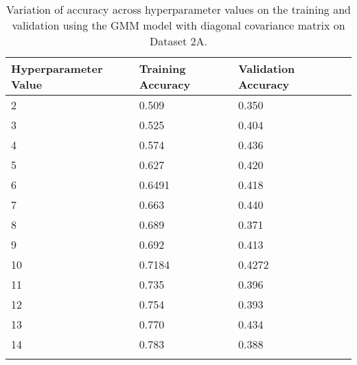 \begin{center}
\begin{longtable}{l l l l}
\hline
\hline
\textbf{Hyperparameter Value} & \textbf{Training Accuracy} & \textbf{Validation Accuracy}\\
\hline
\hline
2 & 0.509 & 0.350\\
3 & 0.525 & 0.404\\
4 & 0.574 & 0.436\\
5 & 0.627 & 0.420\\
6 & 0.6491 & 0.418\\
7 & 0.663 & 0.440\\
8 & 0.689 & 0.371\\
9 & 0.692 & 0.413\\
10 & 0.7184 & 0.4272\\
11 & 0.735 & 0.396\\
12 & 0.754 & 0.393\\
13 & 0.770 & 0.434\\
14 & 0.783 & 0.388\\
\hline
\caption{Variation of accuracy across hyperparameter values on the training and validation using the GMM model with diagonal covariance matrix on Dataset 2A. }
\end{longtable}
\label{tab:acc2a}
\end{center}

